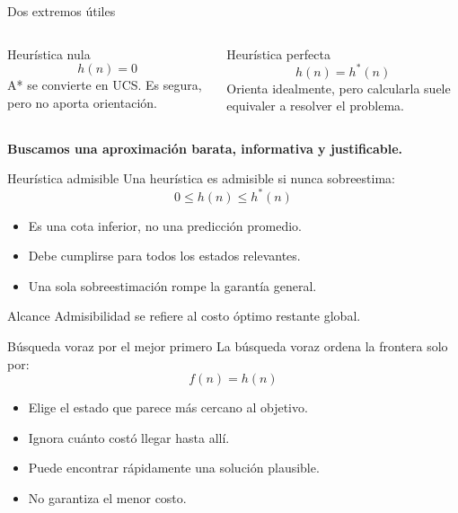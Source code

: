 \documentclass[aspectratio=169,11pt]{beamer}
\newcommand{\concepto}[1]{\textcolor{UAPTeal}{\textbf{#1}}}
\begin{document}
\begin{frame}{Dos extremos útiles}
  \begin{columns}[T]
      \begin{block}{Heurística nula}
        \[
          h(n)=0
        \]
        A* se convierte en UCS. Es segura, pero no aporta orientación.
      \end{block}
      \begin{block}{Heurística perfecta}
        \[
          h(n)=h^*(n)
        \]
        Orienta idealmente, pero calcularla suele equivaler a resolver el problema.
      \end{block}
  \end{columns}
  \vfill
  \centering\concepto{Buscamos una aproximación barata, informativa y justificable.}
\end{frame}

\begin{frame}{Heurística admisible}
  Una heurística es admisible si nunca sobreestima:
  \[
    \boxed{0\leq h(n)\leq h^*(n)}
  \]
  \begin{itemize}
    \item Es una cota inferior, no una predicción promedio.
    \item Debe cumplirse para todos los estados relevantes.
    \item Una sola sobreestimación rompe la garantía general.
  \end{itemize}
  \begin{block}{Alcance}
    Admisibilidad se refiere al costo óptimo restante global.
  \end{block}
\end{frame}

\begin{frame}{Búsqueda voraz por el mejor primero}
  La búsqueda voraz ordena la frontera solo por:
  \[
    \boxed{f(n)=h(n)}
  \]
  \begin{itemize}
    \item Elige el estado que parece más cercano al objetivo.
    \item Ignora cuánto costó llegar hasta allí.
    \item Puede encontrar rápidamente una solución plausible.
    \item No garantiza el menor costo.
  \end{itemize}
\end{frame}
\end{document}
